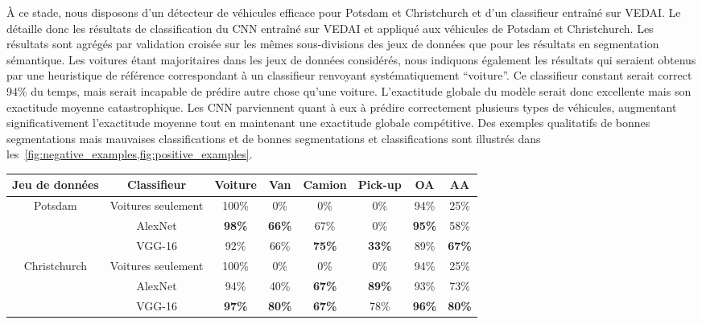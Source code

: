 À ce stade, nous disposons d'un détecteur de véhicules efficace pour Potsdam et Christchurch et d'un classifieur entraîné sur \gls{VEDAI}. Le~ détaille donc les résultats de classification du \gls{CNN} entraîné sur \gls{VEDAI} et appliqué aux véhicules de Potsdam et Christchurch. Les résultats sont agrégés par validation croisée sur les mêmes sous-divisions des jeux de données que pour les résultats en segmentation sémantique. Les voitures étant majoritaires dans les jeux de données considérés, nous indiquons également les résultats qui seraient obtenus par une heuristique de référence correspondant à un classifieur renvoyant systématiquement ``voiture''. Ce classifieur constant serait correct 94\% du temps, mais serait incapable de prédire autre chose qu'une voiture. L'exactitude globale du modèle serait donc excellente mais son exactitude moyenne catastrophique. Les \gls{CNN} parviennent quant à eux à prédire correctement plusieurs types de véhicules, augmentant significativement l'exactitude moyenne tout en maintenant une exactitude globale compétitive. Des exemples qualitatifs de bonnes segmentations mais mauvaises classifications et de bonnes segmentations et classifications sont illustrés dans les~\cref{fig:negative_examples,fig:positive_examples}.

\begin{table}[t]
\centering
  \label{table:results_classif}
  \begin{tabular}{cccccccc}
  \toprule
  \textbf{Jeu de données} & \textbf{Classifieur} & \textbf{Voiture} & \textbf{Van} & \textbf{Camion} & \textbf{Pick-up} & \textbf{OA} & \textbf{AA}\\
  \midrule
  \multirow{3}{*}{Potsdam} & Voitures seulement & 100\% & 0\% & 0\% & 0\% & 94\% & 25\%\\
  & AlexNet & \textbf{98\%} & \textbf{66\%} & 67\% & 0\% & \textbf{95\%} & 58\%\\
  & VGG-16 & 92\% & 66\% & \textbf{75\%} & \textbf{33\%} & 89\% & \textbf{67\%}\\
  \midrule
  \multirow{3}{*}{Christchurch} & Voitures seulement & 100\% & 0\% & 0\% & 0\% & 94\% & 25\%\\
  & AlexNet & 94\% & 40\% & \textbf{67\%} & \textbf{89\%} & 93\% & 73\%\\
  & VGG-16 & \textbf{97\%} & \textbf{80\%} & \textbf{67\%} & 78\% & \textbf{96\%} & \textbf{80\%}\\
  \bottomrule
  \end{tabular}
\end{table}

